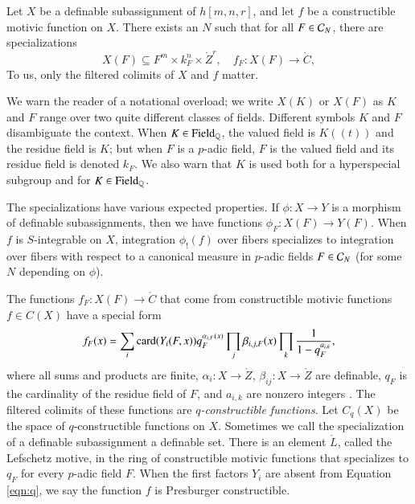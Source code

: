 Let $X$ be a definable subassignment of $h[m,n,r]$, and let $f$ be a
constructible motivic function on $X$.  There exists an $N$ such that
for all $F\in \mathcal C_N$, there are specializations
\[
X(F)\subseteq F^m\times k_F^n\times \ring{Z}^r,  \quad f_F: X(F) \to\ring{C},
\]
To us, only the  filtered colimits of $X$ and $f$ matter.

We warn the reader of a notational overload; we write $X(K)$ or $X(F)$
as $K$ and $F$ range over two quite different classes of fields.
Different symbols $K$ and $F$ disambiguate the context.  When $K\in
{\operatorname{Field}}_{\mathbb{Q}}$, the valued field is $K((t))$ and the residue field is
$K$; but when $F$ is a $p$-adic field, $F$ is the valued field and its
residue field is denoted $k_F$.  We also warn that $K$ is used both for
a hyperspecial subgroup and for $K\in{\operatorname{Field}}_{\mathbb{Q}}$.

The specializations have various expected properties.  If $\phi:X\to
Y$ is a morphism of definable subassignments, then we have functions
$\phi_F:X(F)\to Y(F)$.  When $f$ is $S$-integrable on $X$, integration
$\phi_!(f)$ over fibers specializes to integration over fibers with
respect to a canonical measure in $p$-adic fields $F\in \mathcal C_N$ (for
some $N$ depending on $\phi$).

The functions $f_F:X(F)\to\ring{C}$ that come from constructible
motivic functions $f\in C(X)$ have a special form
\begin{equation}\label{eqn:q}
f_F(x) = \sum_i {\operatorname{card}}(Y_i(F,x)) q_F^{\alpha_{i,F}(x)} 
\prod_j \beta_{i,j,F}(x)\prod_k \frac{1}{1-q_F^{a_{i,k}}},
\end{equation}
where all sums and products are finite, $\alpha_{i}:X\to\ring{Z}$,
$\beta_{ij}:X\to\ring{Z}$ are definable, $q_F$ is the cardinality of
the residue field of $F$, and $a_{i,k}$ are nonzero integers
\cite[\S2]{cluckers2011btransfer}.  The filtered colimits of these
functions are {\it $q$-constructible functions}.  Let $C_q(X)$ be the
space of $q$-constructible functions on $X$.  Sometimes we call the
specialization of a definable subassignment a definable set.  There is
an element $\ring{L}$, called the Lefschetz motive, in the ring of
constructible motivic functions that specializes to $q_F$ for every
$p$-adic field $F$.  When the first factors $Y_i$ are absent from
Equation \ref{eqn:q}, we say the function $f$ is Presburger
constructible.

